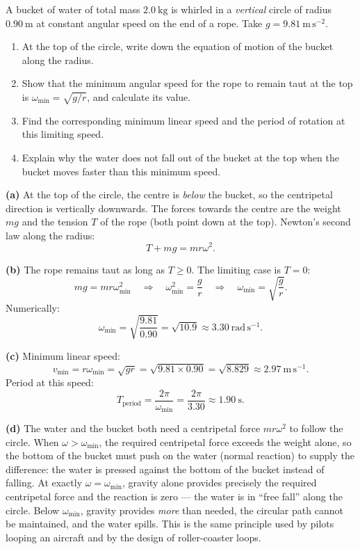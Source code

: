 \documentclass[11pt]{article}
\begin{document}
\begin{exoresolu}
A bucket of water of total mass $2.0\ \mathrm{kg}$ is whirled in a \emph{vertical} circle of radius $0.90\ \mathrm{m}$ at constant angular speed on the end of a rope. Take $g = 9.81\ \mathrm{m\,s^{-2}}$.
\begin{enumerate}
\item[(a)] At the top of the circle, write down the equation of motion of the bucket along the radius.
\item[(b)] Show that the minimum angular speed for the rope to remain taut at the top is $\omega_{\min} = \sqrt{g/r}$, and calculate its value.
\item[(c)] Find the corresponding minimum linear speed and the period of rotation at this limiting speed.
\item[(d)] Explain why the water does not fall out of the bucket at the top when the bucket moves faster than this minimum speed.
\end{enumerate}
\tcblower
\textbf{(a)} At the top of the circle, the centre is \emph{below} the bucket, so the centripetal direction is vertically downwards. The forces towards the centre are the weight $mg$ and the tension $T$ of the rope (both point down at the top). Newton's second law along the radius:
\[ T + mg = mr\omega^2. \]

\textbf{(b)} The rope remains taut as long as $T \ge 0$. The limiting case is $T = 0$:
\[ mg = mr\omega_{\min}^2 \quad\Longrightarrow\quad \omega_{\min}^2 = \frac{g}{r} \quad\Longrightarrow\quad \omega_{\min} = \sqrt{\frac{g}{r}}. \]
Numerically:
\[ \omega_{\min} = \sqrt{\frac{9.81}{0.90}} = \sqrt{10.9} \approx 3.30\ \mathrm{rad\,s^{-1}}. \]

\textbf{(c)} Minimum linear speed:
\[ v_{\min} = r\omega_{\min} = \sqrt{gr} = \sqrt{9.81 \times 0.90} = \sqrt{8.829} \approx 2.97\ \mathrm{m\,s^{-1}}. \]
Period at this speed:
\[ T_{\text{period}} = \frac{2\pi}{\omega_{\min}} = \frac{2\pi}{3.30} \approx 1.90\ \mathrm{s}. \]

\textbf{(d)} The water and the bucket both need a centripetal force $mr\omega^2$ to follow the circle. When $\omega > \omega_{\min}$, the required centripetal force exceeds the weight alone, so the bottom of the bucket must push on the water (normal reaction) to supply the difference: the water is pressed against the bottom of the bucket instead of falling. At exactly $\omega = \omega_{\min}$, gravity alone provides precisely the required centripetal force and the reaction is zero — the water is in ``free fall'' along the circle. Below $\omega_{\min}$, gravity provides \emph{more} than needed, the circular path cannot be maintained, and the water spills. This is the same principle used by pilots looping an aircraft and by the design of roller-coaster loops.
\end{exoresolu}
\end{document}
